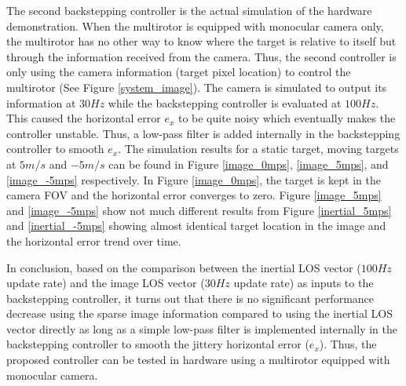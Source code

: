The second backstepping controller is the actual simulation of the hardware demonstration. When the multirotor is equipped with monocular camera only, the multirotor has no other way to know where the target is relative to itself but through the information received from the camera. Thus, the second controller is only using the camera information (target pixel location) to control the multirotor (See Figure \ref{system_image}). The camera is simulated to output its information at $30Hz$ while the backstepping controller is evaluated at $100Hz$. This caused the horizontal error $e_x$ to be quite noisy which eventually makes the controller unstable. Thus, a low-pass filter is added internally in the backstepping controller to smooth $e_x$. The simulation results for a static target, moving targets at $5m/s$ and $-5m/s$ can be found in Figure \ref{image_0mps}, \ref{image_5mps}, and \ref{image_-5mps} respectively. In Figure \ref{image_0mps}, the target is kept in the camera FOV and the horizontal error converges to zero. Figure \ref{image_5mps} and \ref{image_-5mps} show not much different results from Figure \ref{inertial_5mps} and \ref{inertial_-5mps} showing almost identical target location in the image and the horizontal error trend over time. 

In conclusion, based on the comparison between the inertial LOS vector ($100Hz$ update rate) and the image LOS vector ($30Hz$ update rate) as inputs to the backstepping controller, it turns out that there is no significant performance decrease using the sparse image information compared to using the inertial LOS vector directly as long as a simple low-pass filter is implemented internally in the backstepping controller to smooth the jittery horizontal error ($e_x$). Thus, the proposed controller can be tested in hardware using a multirotor equipped with monocular camera.

